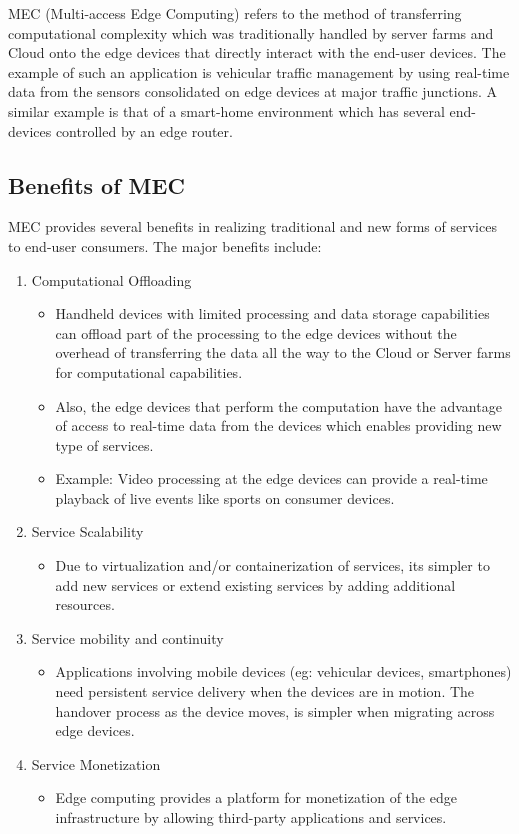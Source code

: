 MEC (Multi-access Edge Computing) refers to the method of transferring computational complexity which was traditionally handled by server farms and Cloud onto the edge devices that directly interact with the end-user devices. The example of such an application is vehicular traffic management by using real-time data from the sensors consolidated on edge devices at major traffic junctions. A similar example is that of a smart-home environment which has several end-devices controlled by an edge router. 

\subsection{Benefits of MEC}
MEC provides several benefits in realizing traditional and new forms of services to end-user consumers. The major benefits include:

\begin{enumerate}
	\item Computational Offloading
	\begin{itemize}
		\item Handheld devices with limited processing and data storage capabilities can offload part of the processing to the edge devices without the overhead of transferring the data all the way to the Cloud or Server farms for computational capabilities.
		\item Also, the edge devices that perform the computation have the advantage of access to real-time data from the devices which enables providing new type of services.
		\item Example: Video processing at the edge devices can provide a real-time playback of live events like sports on consumer devices. 
	\end{itemize}
	\item Service Scalability
		\begin{itemize}
		\item Due to virtualization and/or containerization of services, its simpler to add new services or extend existing services by adding additional resources.	 
		\end{itemize}
    \item Service mobility and continuity
    	\begin{itemize}
        \item Applications involving mobile devices (eg: vehicular devices, smartphones) need persistent service delivery when the devices are in motion. The handover process as the device moves, is simpler when migrating across edge devices.
        \end{itemize}
    \item Service Monetization
    	\begin{itemize}
        \item Edge computing provides a platform for monetization of the edge infrastructure by allowing third-party applications and services.
        \end{itemize}
\end{enumerate}

